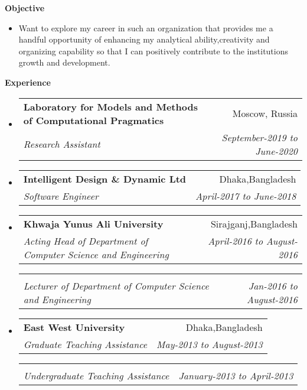 \documentclass[letterpaper,10pt]{article}
\makeatletter
\newcommand{\resitem}[1]{\item #1 \vspace{-2pt}}
\newcommand{\resheading}[1]{{\large \colorbox{mygrey}{\begin{minipage}{\textwidth}{\textbf{#1 \vphantom{p\^{E}}}}\end{minipage}}}}
\newcommand{\ressubheading}[4]{
\begin{tabular*}{6.5in}{l@{\extracolsep{\fill}}r}
		\textbf{#1} & #2 \\
		\textit{#3} & \textit{#4} \\
\end{tabular*}\vspace{-6pt}}
\makeatother
\begin{document}
\resheading{Objective}
\begin{itemize}
\resitem{ \justify
 Want to explore my career in such an organization that provides me a handful opportunity of enhancing my analytical ability,creativity and organizing capability so that I can positively contribute to the institutions growth and development.


 }
\end{itemize}

\vspace{0.1in}
\resheading{Experience}
\begin{itemize}


\item

\ressubheading{Laboratory for Models and Methods of Computational Pragmatics}{Moscow, Russia}{Research Assistant}{September-2019 to June-2020}

\item

\ressubheading{Intelligent Design \& Dynamic Ltd}{Dhaka,Bangladesh}{Software Engineer}{April-2017 to June-2018}
\item
\ressubheading{Khwaja Yunus Ali University}{Sirajganj,Bangladesh}{Acting Head of Department of Computer Science and Engineering}{April-2016 to August-2016}
\ressubheading{ }{}{Lecturer of Department of Computer Science and Engineering}{Jan-2016 to August-2016 }
\item
	\ressubheading{East West University}{Dhaka,Bangladesh}{Graduate Teaching Assistance }{May-2013 to August-2013 }
\ressubheading{}{}{Undergraduate Teaching Assistance}{January-2013 to April-2013}	
\end{itemize}
\end{document}
